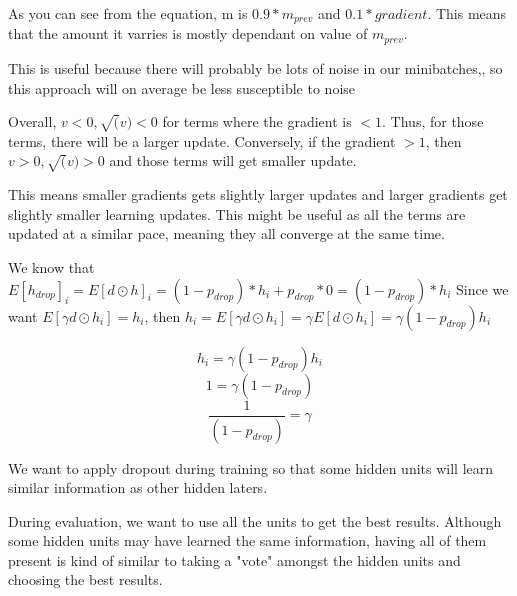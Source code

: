 \documentclass[11pt,largemargins]{homework}
\begin{document}
\maketitle
 
\question
As you can see from the equation, m is $0.9 * m_{prev}$ and $0.1 * gradient$. This means that the amount it varries is mostly dependant on value of $m_{prev}$. 

This is useful because there will probably be lots of noise in our minibatches,, so this approach will on average be less susceptible to noise

\question
Overall, $v<0, \sqrt(v) < 0$ for terms where the gradient is $<1$. Thus, for those terms, there will be a  larger update. Conversely, if the gradient $>1$, then $v > 0, \sqrt(v) > 0$ and those terms will get smaller update. 

This means smaller gradients gets slightly larger updates and larger gradients get slightly smaller learning updates. This might be useful as all the terms are updated at a similar pace, meaning they all converge at the same time. 

\question
We know that $E[h_{drop}]_i = E[d \odot h]_i = (1-p_{drop}) * h_i  + p_{drop} * 0 = (1-p_{drop}) * h_i$
Since we want $E[\gamma d \odot h_i] = h_i$, then $h_i = E[\gamma d \odot h_i] = \gamma  E[d \odot h_i] = \gamma (1-p_{drop}) h_i $


$$ h_i = \gamma (1-p_{drop}) h_i $$
$$ 1 = \gamma (1-p_{drop}) $$
$$ \frac{1}{(1-p_{drop})} = \gamma $$

\question
We want to apply dropout during training so that some hidden units will learn similar information as other hidden laters. 

During evaluation, we want to use all the units to get the best results. Although some hidden units may have learned the same information, having all of them present is kind of similar to taking a "vote" amongst the hidden units and choosing the best results. 
\end{document}
